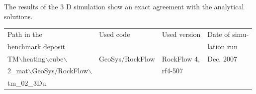 The results of the 3 D simulation show an exact agreement with the analytical solutions.

\begin{tabular}{|l|l|l|l|}
\hline
Path in the & Used code	& Used version & Date of simu- \\
benchmark deposit	& & & lation run \\
\hline	
TM$\backslash$heating$\backslash$cube$\backslash$	& GeoSys/RockFlow	& RockFlow 4, & Dec. 2007 \\
2\_mat$\backslash$GeoSys/RockFlow$\backslash$	& & rf4-507 & \\
tm\_02\_3Du	& & & \\
\hline	
\end{tabular}
